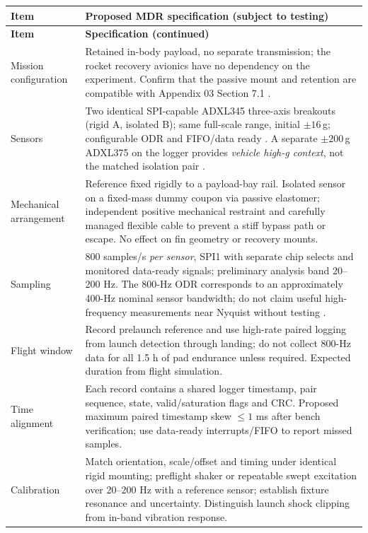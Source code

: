 \small
\begingroup
{}
\begin{longtable}{@{}L{39mm}L{107mm}@{}}
\toprule{}\textbf{Item}&\textbf{Proposed MDR specification (subject to testing)}\\\midrule\endfirsthead
\toprule{}\textbf{Item}&\textbf{Specification (continued)}\\\midrule\endhead
\bottomrule\endlastfoot
Mission configuration & Retained in-body payload, no separate transmission; the rocket recovery avionics have no dependency on the experiment. Confirm that the passive mount and retention are compatible with Appendix 03 Section 7.1 \cite{rtc2027app03}.\\
Sensors & Two identical SPI-capable ADXL345 three-axis breakouts (rigid A, isolated B); same full-scale range, initial $\pm16$\,g; configurable ODR and FIFO/data ready \cite{adxl345ds}. A separate $\pm200$\,g ADXL375 on the logger provides \emph{vehicle high-g context}, not the matched isolation pair \cite{adxl375ds}.\\
Mechanical arrangement & Reference fixed rigidly to a payload-bay rail. Isolated sensor on a fixed-mass dummy coupon via passive elastomer; independent positive mechanical restraint and carefully managed flexible cable to prevent a stiff bypass path or escape. No effect on fin geometry or recovery mounts.\\
Sampling & 800 samples/s \emph{per sensor}, SPI1 with separate chip selects and monitored data-ready signals; preliminary analysis band 20--200 Hz. The 800-Hz ODR corresponds to an approximately 400-Hz nominal sensor bandwidth; do not claim useful high-frequency measurements near Nyquist without testing \cite{adxl345ds}.\\
Flight window & Record prelaunch reference and use high-rate paired logging from launch detection through landing; do not collect 800-Hz data for all 1.5 h of pad endurance unless required. Expected duration  from flight simulation.\\
Time alignment & Each record contains a shared logger timestamp, pair sequence, state, valid/saturation flags and CRC. Proposed maximum paired timestamp skew $\le1$ ms after bench verification; use data-ready interrupts/FIFO to report missed samples.\\
Calibration & Match orientation, scale/offset and timing under identical rigid mounting; preflight shaker or repeatable swept excitation over 20--200 Hz with a reference sensor; establish fixture resonance and uncertainty. Distinguish launch shock clipping from in-band vibration response.\\

\end{longtable}
